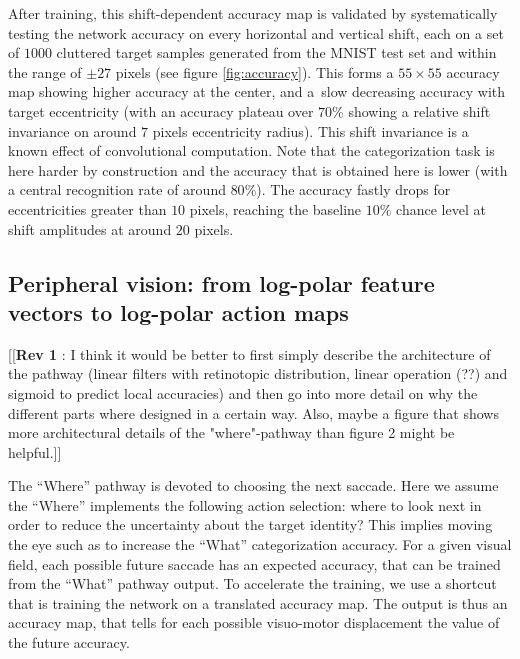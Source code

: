 After training, this shift-dependent accuracy map is validated by systematically testing the network accuracy on every horizontal and vertical shift, each on a set of $1000$ cluttered target samples generated from the MNIST test set and within the range of $\pm 27$ pixels (see figure \ref{fig:accuracy}).  This forms a $55\times 55$ accuracy map showing higher accuracy at the center, and a slow decreasing accuracy with target eccentricity (with an accuracy plateau  over $70\%$ showing a relative shift invariance on around $7$ pixels eccentricity radius). This shift invariance is a known effect of convolutional computation. Note that the categorization task is here harder by construction and the accuracy that is obtained here is lower (with a central recognition rate of around $80\%$). The accuracy fastly drops for eccentricities  greater than $10$ pixels, reaching the baseline $10\%$ chance level at shift amplitudes at around $20$ pixels.




\subsection*{Peripheral vision: from log-polar feature vectors to log-polar action maps}
%
%
%
{\color{magenta} [[\textbf{Rev 1} : I think it would be better to first simply describe the architecture of the pathway (linear filters with retinotopic distribution, linear operation (??) and sigmoid to predict local accuracies) and then go into more detail on why the different parts where designed in a certain way. Also, maybe a figure that shows more architectural details of the "where"-pathway than figure 2 might be helpful.]]}

The ``Where'' pathway is devoted to choosing the next saccade.
Here we assume the ``Where'' implements the following action selection: where to look next in order to reduce the uncertainty about the target identity? This implies moving the eye such as to increase the ``What'' categorization accuracy. For a given visual field, each possible future saccade has an expected accuracy, that can be trained from the ``What'' pathway output. To accelerate the training, we use a shortcut that is training the network on a translated accuracy map. The output is thus an accuracy map, that tells for each possible visuo-motor displacement the value of the future accuracy.

